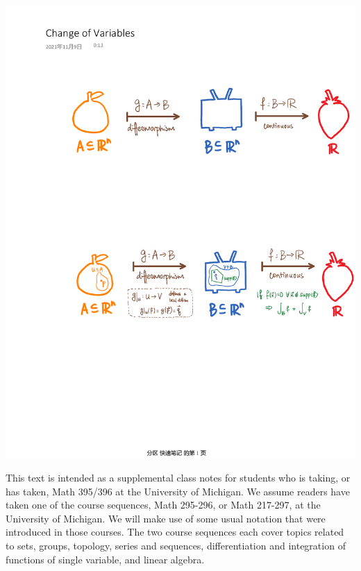 \documentclass[11pt,oneside]{book}
\theoremstyle{break}
\theoremstyle{break}
\begin{document}
\newpage

\tableofcontents
{}

\newpage
\vspace*{5cm}
\begin{center}
\includegraphics[scale=0.8]{cor13.4.pdf}\\
\end{center}
\vspace*{\fill}
This text is intended as a supplemental class notes for students who is taking, or has taken, Math 395/396 at the University of Michigan. We assume readers have taken one of the course sequences, Math 295-296, or Math 217-297, at the University of Michigan. We will make use of some usual notation that were introduced in those courses. The two course sequences each cover topics related to sets, groups, topology, series and sequences, differentiation and integration of functions of single variable, and linear algebra.\\
\end{document}
